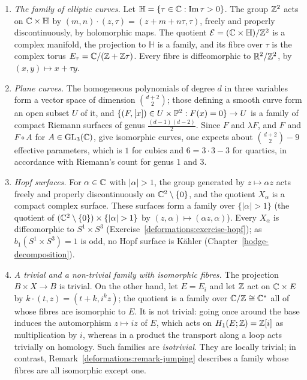 \begin{example}\label{deformations:example-families}
\begin{enumerate}
\item \emph{The family of elliptic curves.} Let $\mathbb{H} = \{\tau \in \mathbb{C} : \operatorname{Im}\tau > 0\}$. The group $\mathbb{Z}^2$ acts on $\mathbb{C} \times \mathbb{H}$ by
$(m, n)\cdot(z, \tau) = (z + m + n\tau, \tau)$, freely and properly discontinuously, by holomorphic maps. The quotient $\mathcal{E} = (\mathbb{C} \times \mathbb{H})/\mathbb{Z}^2$ is a complex manifold, the projection
to $\mathbb{H}$ is a family, and its fibre over $\tau$ is the complex torus $E_\tau = \mathbb{C}/(\mathbb{Z} + \mathbb{Z}\tau)$. Every fibre is diffeomorphic to $\mathbb{R}^2/\mathbb{Z}^2$, by $(x, y) \mapsto x + \tau y$.
\item \emph{Plane curves.} The homogeneous polynomials of degree $d$ in three variables form a vector space of dimension $\binom{d+2}{2}$; those defining a smooth curve form an open subset $U$ of it, and
$\{(F, [x]) \in U \times \mathbb{P}^2 : F(x) = 0\} \to U$ is a family of compact Riemann surfaces of genus $\frac{(d-1)(d-2)}{2}$. Since $F$ and $\lambda F$, and $F$ and $F \circ A$ for $A \in \mathrm{GL}_3(\mathbb{C})$, give
isomorphic curves, one expects about $\binom{d+2}{2} - 9$ effective parameters, which is $1$ for cubics and $6 = 3 \cdot 3 - 3$ for quartics, in accordance with Riemann's count for genus $1$ and $3$.
\item \emph{Hopf surfaces.} For $\alpha \in \mathbb{C}$ with $|\alpha| > 1$, the group generated by $z \mapsto \alpha z$ acts freely and properly discontinuously on $\mathbb{C}^2 \setminus \{0\}$, and the quotient $X_\alpha$
is a compact complex surface. These surfaces form a family over $\{|\alpha| > 1\}$ (the quotient of $(\mathbb{C}^2 \setminus \{0\}) \times \{|\alpha| > 1\}$ by $(z, \alpha) \mapsto (\alpha z, \alpha)$). Every
$X_\alpha$ is diffeomorphic to $S^1 \times S^3$ (Exercise~\ref{deformations:exercise-hopf}); as $b_1(S^1 \times S^3) = 1$ is odd, no Hopf surface is K\"ahler (Chapter~\ref{hodge-decomposition}).
\item \emph{A trivial and a non-trivial family with isomorphic fibres.} The projection $B \times X \to B$ is trivial. On the other hand, let $E = E_i$ and let $\mathbb{Z}$ act on $\mathbb{C} \times E$ by
$k\cdot(t, z) = (t + k, i^kz)$; the quotient is a family over $\mathbb{C}/\mathbb{Z} \cong \mathbb{C}^*$ all of whose fibres are isomorphic to $E$. It is not trivial: going once around the base induces the automorphism
$z \mapsto iz$ of $E$, which acts on $H_1(E; \mathbb{Z}) = \mathbb{Z}[i]$ as multiplication by $i$, whereas in a product the transport along a loop acts trivially on homology. Such families are \emph{isotrivial}. They are locally trivial; in contrast, Remark~\ref{deformations:remark-jumping} describes a family whose fibres are all isomorphic except one.
\end{enumerate}
\end{example}

